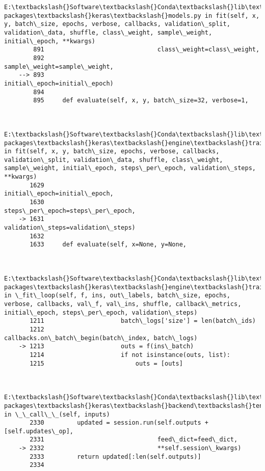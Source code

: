 \documentclass[11pt]{article}
\begin{document}
\begin{Verbatim}[commandchars=\\\{\}]
        E:\textbackslash{}Software\textbackslash{}Conda\textbackslash{}lib\textbackslash{}site-packages\textbackslash{}keras\textbackslash{}models.py in fit(self, x, y, batch\_size, epochs, verbose, callbacks, validation\_split, validation\_data, shuffle, class\_weight, sample\_weight, initial\_epoch, **kwargs)
        891                               class\_weight=class\_weight,
        892                               sample\_weight=sample\_weight,
    --> 893                               initial\_epoch=initial\_epoch)
        894 
        895     def evaluate(self, x, y, batch\_size=32, verbose=1,
    

        E:\textbackslash{}Software\textbackslash{}Conda\textbackslash{}lib\textbackslash{}site-packages\textbackslash{}keras\textbackslash{}engine\textbackslash{}training.py in fit(self, x, y, batch\_size, epochs, verbose, callbacks, validation\_split, validation\_data, shuffle, class\_weight, sample\_weight, initial\_epoch, steps\_per\_epoch, validation\_steps, **kwargs)
       1629                               initial\_epoch=initial\_epoch,
       1630                               steps\_per\_epoch=steps\_per\_epoch,
    -> 1631                               validation\_steps=validation\_steps)
       1632 
       1633     def evaluate(self, x=None, y=None,
    

        E:\textbackslash{}Software\textbackslash{}Conda\textbackslash{}lib\textbackslash{}site-packages\textbackslash{}keras\textbackslash{}engine\textbackslash{}training.py in \_fit\_loop(self, f, ins, out\_labels, batch\_size, epochs, verbose, callbacks, val\_f, val\_ins, shuffle, callback\_metrics, initial\_epoch, steps\_per\_epoch, validation\_steps)
       1211                     batch\_logs['size'] = len(batch\_ids)
       1212                     callbacks.on\_batch\_begin(batch\_index, batch\_logs)
    -> 1213                     outs = f(ins\_batch)
       1214                     if not isinstance(outs, list):
       1215                         outs = [outs]
    

        E:\textbackslash{}Software\textbackslash{}Conda\textbackslash{}lib\textbackslash{}site-packages\textbackslash{}keras\textbackslash{}backend\textbackslash{}tensorflow\_backend.py in \_\_call\_\_(self, inputs)
       2330         updated = session.run(self.outputs + [self.updates\_op],
       2331                               feed\_dict=feed\_dict,
    -> 2332                               **self.session\_kwargs)
       2333         return updated[:len(self.outputs)]
       2334 
    


\end{Verbatim}
\end{document}
